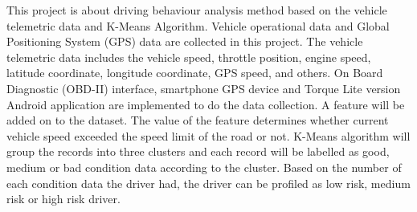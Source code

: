 
This project is about driving behaviour analysis method based on the vehicle telemetric data and K-Means Algorithm. Vehicle operational data and Global Positioning System (GPS) data are collected in this project. The vehicle telemetric data includes the vehicle speed, throttle position, engine speed, latitude coordinate, longitude coordinate, GPS speed, and others. On Board Diagnostic (OBD-II) interface, smartphone GPS device and Torque Lite version Android application are implemented to do the data collection. A feature will be added on to the dataset. The value of the feature determines whether current vehicle speed exceeded the speed limit of the road or not. K-Means algorithm will group the records into three clusters and each record will be labelled as good, medium or bad condition data according to the cluster. Based on the number of each condition data the driver had, the driver can be profiled as low risk, medium risk or high risk driver.